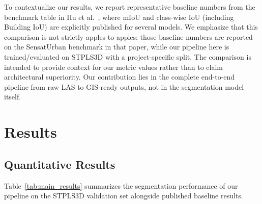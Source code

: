 \documentclass[11pt]{article}
\begin{document}
To contextualize our results, we report representative baseline numbers from the benchmark table in Hu et al.~\cite{hu2021stpls3d}, where mIoU and class-wise IoU (including Building IoU) are explicitly published for several models.
We emphasize that this comparison is not strictly apples-to-apples: those baseline numbers are reported on the SensatUrban benchmark in that paper, while our pipeline here is trained/evaluated on STPLS3D with a project-specific split.
The comparison is intended to provide context for our metric values rather than to claim architectural superiority.
Our contribution lies in the complete end-to-end pipeline from raw LAS to GIS-ready outputs, not in the segmentation model itself.

\section{Results}
\label{sec:results}

\subsection{Quantitative Results}
\label{sec:results_quantitative}

Table~\ref{tab:main_results} summarizes the segmentation performance of our pipeline on the STPLS3D validation set alongside published baseline results.
\end{document}

